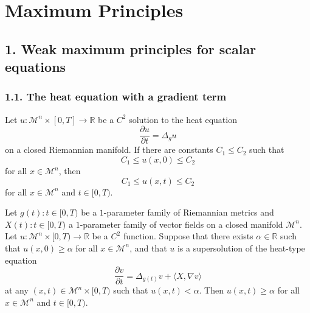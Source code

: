 \chapter{Maximum Principles}

\section*{1. Weak maximum principles for scalar equations}

\subsection*{1.1. The heat equation with a gradient term}

\begin{proposition}
\label{ch04-prop-scalar-max-principle-pointwise-bounds}

Let \(u : \mathcal M^n \times [0,T] \to \mathbb R\) be a \(C^2\) solution to the heat equation
\[
\frac{\partial u}{\partial t} = \Delta_g u
\]
on a closed Riemannian manifold. If there are constants \(C_1 \le C_2\) such that
\[
C_1 \le u(x,0) \le C_2
\]
for all \(x \in \mathcal M^n\), then
\[
C_1 \le u(x,t) \le C_2
\]
for all \(x \in \mathcal M^n\) and \(t \in [0,T)\).
\end{proposition}

\begin{theorem}
\label{ch04-thm-scalar-max-principle-supersolution-lower-bound}

Let \(g(t) : t \in [0,T)\) be a \(1\)-parameter family of Riemannian metrics and \(X(t) : t \in [0,T)\) a \(1\)-parameter family of vector fields on a closed manifold \(\mathcal M^n\). Let \(u : \mathcal M^n \times [0,T) \to \mathbb R\) be a \(C^2\) function. Suppose that there exists \(\alpha \in \mathbb R\) such that \(u(x,0) \ge \alpha\) for all \(x \in \mathcal M^n\), and that \(u\) is a supersolution of the heat-type equation
\[
\frac{\partial v}{\partial t} = \Delta_{g(t)} v + \langle X, \nabla v \rangle
\]
at any \((x,t) \in \mathcal M^n \times [0,T)\) such that \(u(x,t) < \alpha\). Then \(u(x,t) \ge \alpha\) for all \(x \in \mathcal M^n\) and \(t \in [0,T)\).
\end{theorem}

